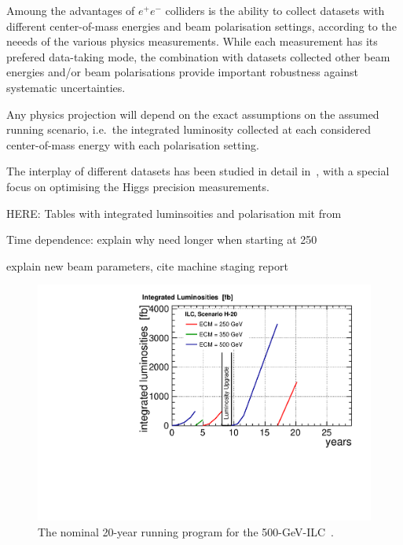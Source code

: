 

Amoung the advantages of $e^+e^-$ colliders is the ability to collect datasets with different center-of-mass energies and beam polarisation settings, according to the neeeds of the various physics measurements.
While each measurement has its prefered data-taking mode, the combination with datasets collected other beam energies and/or beam polarisations provide important robustness against systematic uncertainties.

Any physics projection will depend on the exact assumptions on the assumed running scenario, i.e.\ the integrated luminosity collected at each considered center-of-mass energy with each polarisation setting.


The interplay of different datasets has been studied in detail in~\cite{Barklow:2015tja}, with a special focus on optimising the Higgs precision measurements. 

{\color{red} HERE: Tables with integrated luminsoities and polarisation mit from~\cite{Barklow:2015tja}}

{\color{red} Time dependence: explain why need longer when starting at 250\,\GeV}

{\color{red} explain new beam parameters, cite machine staging report}


\begin{figure}
\begin{center}
\includegraphics[width=0.75\hsize]{chapters/figures/lumi_H-20.pdf}
\end{center}
\caption{The nominal 20-year running program for the 500-GeV-ILC~\cite{Barklow:2015tja}.}
\label{fig:H20}
\end{figure}

